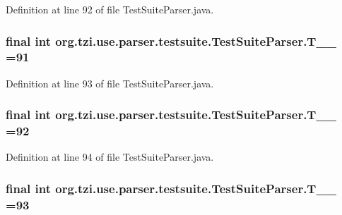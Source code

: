 Definition at line 92 of file Test\-Suite\-Parser.\-java.

\hypertarget{classorg_1_1tzi_1_1use_1_1parser_1_1testsuite_1_1_test_suite_parser_acd270a235796b11b5ac07e679832841e}{
\subsubsection[{T\-\_\-\-\_\-91}]{\setlength{\rightskip}{0pt plus 5cm}final int org.\-tzi.\-use.\-parser.\-testsuite.\-Test\-Suite\-Parser.\-T\-\_\-\-\_ =91\hspace{0.3cm}{\ttfamily [static]}}}\label{classorg_1_1tzi_1_1use_1_1parser_1_1testsuite_1_1_test_suite_parser_acd270a235796b11b5ac07e679832841e}


Definition at line 93 of file Test\-Suite\-Parser.\-java.

\hypertarget{classorg_1_1tzi_1_1use_1_1parser_1_1testsuite_1_1_test_suite_parser_a6eab62a4124b5e72f9e40641ede29ea4}{
\subsubsection[{T\-\_\-\-\_\-92}]{\setlength{\rightskip}{0pt plus 5cm}final int org.\-tzi.\-use.\-parser.\-testsuite.\-Test\-Suite\-Parser.\-T\-\_\-\-\_ =92\hspace{0.3cm}{\ttfamily [static]}}}\label{classorg_1_1tzi_1_1use_1_1parser_1_1testsuite_1_1_test_suite_parser_a6eab62a4124b5e72f9e40641ede29ea4}


Definition at line 94 of file Test\-Suite\-Parser.\-java.

\hypertarget{classorg_1_1tzi_1_1use_1_1parser_1_1testsuite_1_1_test_suite_parser_a13276f6183173bcfa21a19e66c9fffb8}{
\subsubsection[{T\-\_\-\-\_\-93}]{\setlength{\rightskip}{0pt plus 5cm}final int org.\-tzi.\-use.\-parser.\-testsuite.\-Test\-Suite\-Parser.\-T\-\_\-\-\_ =93\hspace{0.3cm}{\ttfamily [static]}}}\label{classorg_1_1tzi_1_1use_1_1parser_1_1testsuite_1_1_test_suite_parser_a13276f6183173bcfa21a19e66c9fffb8}



